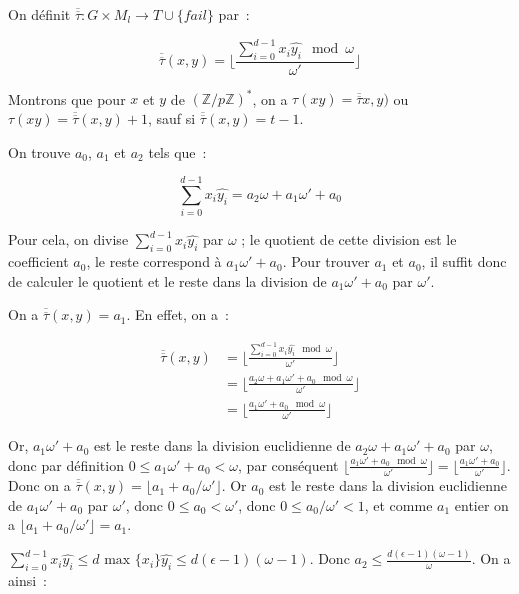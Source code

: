 		On définit $\overline{\overline{\tau}} : G \times M_l \longrightarrow T \cup \{fail\}$ par~:
		
		$$\overline{\overline{\tau}}(x,y) = \lfloor \frac{\sum_{i=0}^{d-1} x_i \hat{y_i}\mod \omega}{\omega'} \rfloor$$
		
		Montrons que pour $x$ et $y$ de $(\mathbb{Z}/p\mathbb{Z})^*$, on a $\tau(xy) = \overline{\overline{\tau}}x,y)$ ou $\tau(xy) = \overline{\overline{\tau}}(x,y) + 1$, sauf si $\overline{\overline{\tau}}(x,y) = t - 1$.
		
		On trouve $a_0$, $a_1$ et $a_2$ tels que~:
		
		$$ \sum_{i=0}^{d-1} x_i \hat{y_i} = a_2\omega + a_1\omega' + a_0 $$
		
		Pour cela, on divise $\sum_{i=0}^{d-1} x_i \hat{y_i}$ par $\omega$ ; le quotient de cette division est le coefficient $a_0$, le reste correspond à $a_1\omega' + a_0$. Pour trouver $a_1$ et $a_0$, il suffit donc de calculer le quotient et le reste dans la division de $a_1\omega' + a_0$ par $\omega'$.
		
		On a $\overline{\overline{\tau}}(x,y) = a_1$. En effet, on a~:
		
		\begin{align*}
		\overline{\overline{\tau}}(x,y) &= \lfloor \frac{\sum_{i=0}^{d-1} x_i \hat{y_i}\mod \omega}{\omega'} \rfloor \\
		                                &= \lfloor \frac{a_2\omega + a_1\omega' + a_0\mod \omega}{\omega'} \rfloor \\
		                                &= \lfloor \frac{a_1\omega' + a_0\mod \omega}{\omega'} \rfloor
		\end{align*}
		
		Or, $a_1\omega' + a_0$ est le reste dans la division euclidienne de $a_2\omega + a_1\omega' + a_0$ par $\omega$, donc par définition $0 \leq a_1\omega' + a_0 <  \omega$, par conséquent $\lfloor \frac{a_1\omega' + a_0\mod \omega}{\omega'} \rfloor = \lfloor \frac{a_1\omega' + a_0}{\omega'} \rfloor$. Donc on a $\overline{\overline{\tau}}(x,y) = \lfloor a_1 + a_0/\omega' \rfloor$. Or $a_0$ est le reste dans la division euclidienne de $a_1\omega' + a_0$ par $\omega'$, donc $0 \leq a_0 < \omega'$, donc $0 \leq a_0/\omega' < 1$, et comme $a_1$ entier on a $\lfloor a_1 + a_0/\omega' \rfloor = a_1$.
		
		$\sum_{i=0}^{d-1} x_i \hat{y_i} \leq d \text{\ max }\{x_i\} \hat{y_i} \leq d(\epsilon - 1)(\omega - 1)$. Donc $a_2 \leq \frac{d(\epsilon - 1)(\omega - 1)}{\omega}$. On a ainsi~:
		
